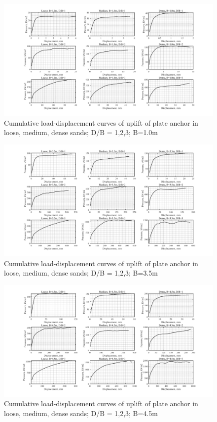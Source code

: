 \documentclass[a4paper, nobind]{templates/ociamthesis}
\begin{document}
\begin{landscape}
\begin{figure}[H]
\includegraphics[width=1\linewidth]{myfigureeeeee/CodeC} \caption{Cumulative load-displacement curves of uplift of plate anchor in loose, medium, dense sands; D/B = 1,2,3; B=1.0m}\label{fig:unnamed-chunk-50}
\end{figure}

\begin{figure}[H]
\includegraphics[width=1\linewidth]{myfigureeeeee/CodeD} \caption{Cumulative load-displacement curves of uplift of plate anchor in loose, medium, dense sands; D/B = 1,2,3; B=3.5m}\label{fig:unnamed-chunk-51}
\end{figure}

\begin{figure}[H]
\includegraphics[width=1\linewidth]{myfigureeeeee/CodeE} \caption{Cumulative load-displacement curves of uplift of plate anchor in loose, medium, dense sands; D/B = 1,2,3; B=4.5m}\label{fig:unnamed-chunk-52}
\end{figure}


\end{landscape}
\end{document}
